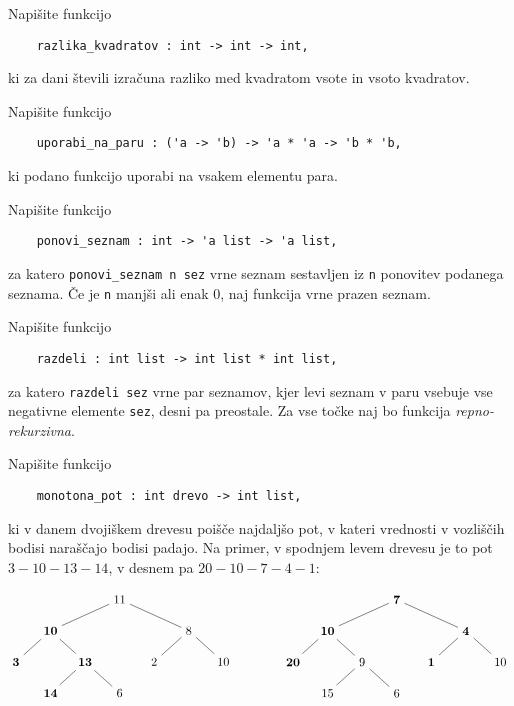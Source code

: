 \documentclass[arhiv]{../izpit}
\begin{document}

\naloga[]

\podnaloga
Napišite funkcijo
\begin{verbatim}
    razlika_kvadratov : int -> int -> int,
\end{verbatim}
ki za dani števili izračuna razliko med kvadratom vsote in vsoto kvadratov.

\podnaloga
Napišite funkcijo
\begin{verbatim}
    uporabi_na_paru : ('a -> 'b) -> 'a * 'a -> 'b * 'b,
\end{verbatim}
ki podano funkcijo uporabi na vsakem elementu para.

\podnaloga
Napišite funkcijo
\begin{verbatim}
    ponovi_seznam : int -> 'a list -> 'a list,
\end{verbatim}
za katero \verb|ponovi_seznam n sez| vrne seznam sestavljen iz \verb|n| ponovitev podanega seznama.
Če je \verb|n| manjši ali enak $0$, naj funkcija vrne prazen seznam.

\podnaloga
Napišite funkcijo
\begin{verbatim}
    razdeli : int list -> int list * int list,
\end{verbatim}
za katero \verb|razdeli sez| vrne par seznamov, kjer levi seznam v paru vsebuje vse negativne elemente \verb|sez|, desni pa preostale.
Za vse točke naj bo funkcija \emph{repno-rekurzivna}.

\naloga
Napišite funkcijo
\begin{verbatim}
    monotona_pot : int drevo -> int list,
\end{verbatim}
ki v danem dvojiškem drevesu poišče najdaljšo pot, v kateri vrednosti v vozliščih bodisi naraščajo bodisi padajo. Na primer, v spodnjem levem drevesu je to pot $3 - 10 - 13 - 14$, v desnem pa $20 - 10 - 7 - 4 - 1$:

\[
  \begin{tikzpicture}[level distance=0.9cm,
    level 1/.style={sibling distance=4cm},
    level 2/.style={sibling distance=2cm},
    level 3/.style={sibling distance=2cm}
    ]
    \node {11}
      child {node {\textbf{10}}
        child {node {\textbf{3}}}
        child {node {\textbf{13}}
          child {node {\textbf{14}}}
          child {node {6}}
        }
      }
      child {node {8}
        child {node {2}}
        child {node {10}}
      };
  \end{tikzpicture}
  \qquad\qquad
  \begin{tikzpicture}[level distance=0.9cm,
    level 1/.style={sibling distance=4cm},
    level 2/.style={sibling distance=2cm},
    level 3/.style={sibling distance=2cm}
    ]
    \node {\textbf{7}}
      child {node {\textbf{10}}
        child {node {\textbf{20}}}
        child {node {9}
          child {node {15}}
          child {node {6}}
        }
      }
      child {node {\textbf{4}}
        child {node {\textbf{1}}}
        child {node {10}}
      };
  \end{tikzpicture}
\]
\prostor
\end{document}
